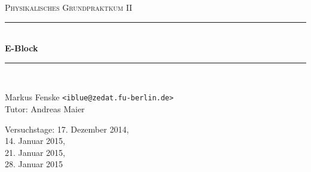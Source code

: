 \newcommand{\HRule}{\rule{\linewidth}{0.5mm}}

\begin{center}
  \textsc{\Large Physikalisches Grundpraktkum II}
  \HRule\\[0.4 cm]
  {\huge \bfseries E-Block}
  \HRule\\[0.4 cm]

  \begin{minipage}{0.60\textwidth}
  \begin{flushleft}
    Markus Fenske \texttt{<iblue@zedat.fu-berlin.de>} \\
    Tutor: Andreas Maier
    \vspace{16mm}
  \end{flushleft}
  \end{minipage}
  \hfill
  \begin{minipage}{0.35\textwidth}
  \begin{flushright}
    Versuchstage: 17. Dezember 2014,\\ 14. Januar 2015,\\ 21. Januar 2015,\\ 28. Januar 2015\;
  \end{flushright}
  \end{minipage}

  \tableofcontents


  \vfill
\end{center}
\newpage
